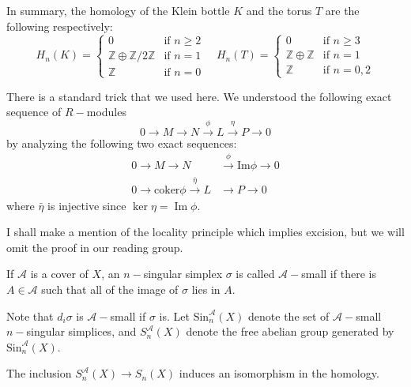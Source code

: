 \documentclass[12pt,reqno]{amsart}
\numberwithin{theorem}{section}
\theoremstyle{definition}
\theoremstyle{remark}
\numberwithin{equation}{section}
\newcommand{\cA}{\mathcal{A}}
\newcommand{\Z}{\mathbb Z}
\newcommand{\im}{\operatorname{Im}}
\renewcommand{\Im}{\text{Im}}
\theoremstyle{definition}
\newcommand{\Sin}{\mathrm{Sin}}
\newcommand{\coker}{\mathrm{coker}}
\begin{document}
\begin{example}
    In summary, the homology of the Klein bottle $K$ and the torus $T$ are the following respectively:
    $$H_n(K) = \begin{cases}
        0 & \text{if }n \geq 2\\
        \Z \oplus \Z/2\Z & \text{if } n = 1 \\
        \Z & \text{if } n = 0
    \end{cases}  \quad H_n(T) = \begin{cases}
        0 & \text{if }n \geq 3\\
        
        \Z \oplus \Z & \text{if } n = 1 \\
        \Z & \text{if } n = 0,2
    \end{cases}$$
\end{example}
\begin{remark}
    There is a standard trick that we used here. We understood the following exact sequence of $R-$modules
    $$0 \rightarrow M \rightarrow N \xrightarrow{\phi} L \xrightarrow{\eta} P \rightarrow 0$$
    by analyzing the following two exact sequences:
    \begin{align*}
        0 \rightarrow M \rightarrow N &\xrightarrow{\phi} \Im \phi \rightarrow 0 \\
        0 \rightarrow \coker \phi \xrightarrow{\bar \eta} L &\rightarrow P \rightarrow 0
    \end{align*}
    where $\bar \eta$ is injective since $\ker \eta = \im \phi$.
\end{remark}
I shall make a mention of the locality principle which implies excision, but we will omit the proof in our reading group.
\begin{definition}
    If $\cA$ is a cover of $X$, an $n-$singular simplex $\sigma$ is called $\cA-$small if there is $A \in \cA$ such that all of the image of $\sigma$ lies in $A$.
\end{definition}
Note that $d_i\sigma$ is $\cA-$small if $\sigma$ is. Let $\Sin_n^{\cA}(X)$ denote the set of $\cA-$small $n-$singular simplices, and $S_n^\cA(X)$ denote the free abelian group generated by $\Sin_n^\cA(X)$.
\begin{theorem}
    The inclusion $S_n^\cA(X) \rightarrow S_n(X)$ induces an isomorphism in the homology.
\end{theorem}
\end{document}

